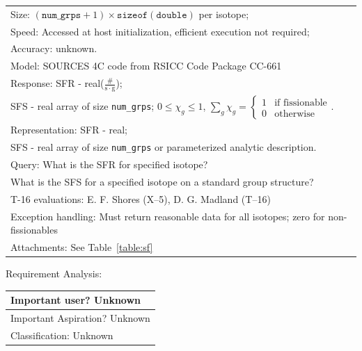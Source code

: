 \documentclass{article}
\begin{document}
\begin{tabular}{|p{433pt}|} \hline
Size: $(\mathtt{num\_grps} + 1) \times \mathtt{sizeof(double)}$ per
isotope; \\ 
Speed: Accessed at host initialization, efficient
execution not required; \\ 
Accuracy: unknown. \\ \hline 
Model: SOURCES 4C code from RSICC Code Package CC-661 \\ \hline 
Response: SFR - real($\frac{\#}{\mathrm{s}\cdot\mathrm{g}}$); \\ 
SFS - real array of size \texttt{num\_grps}; $0
\le \chi_g \le 1$, $\sum_g \chi_g = \left\{ \begin{array}{ll} 1 &
\mbox{if fissionable} \\ 0 & \mbox{otherwise} \end{array} \right.$. \\
\hline 
Representation: SFR - real; \\ 
SFS - real array of size \texttt{num\_grps} or parameterized analytic
description. \\ \hline 
Query: What is the SFR for specified isotope?
\\ What is the SFS for a specified isotope on a standard group
structure?\\ \hline T-16 evaluations: E. F. Shores (X--5),
D. G. Madland (T--16)\\ \hline Exception handling: Must return
reasonable data for all isotopes; zero for non-fissionables \\ \hline
Attachments: See Table~\ref{table:sf} \\ \hline
\end{tabular}
\vspace{24pt}

Requirement Analysis:

\begin{tabular}{|p{433pt}|} \hline
Important user? Unknown \\ \hline
Important Aspiration? Unknown \\ \hline
Classification: Unknown \\ \hline
\end{tabular}
\vspace{24pt}

\newpage
\end{document}
